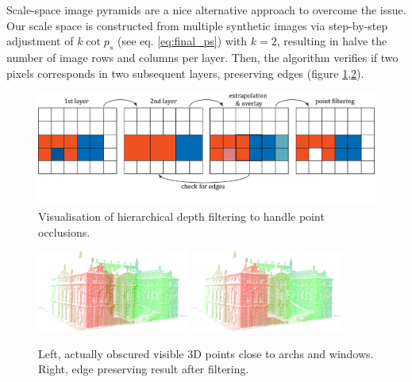 \documentclass[review]{elsarticle}
\begin{document}
Scale-space image pyramids are a nice alternative approach to overcome the issue. Our scale space is constructed from multiple synthetic images via step-by-step adjustment of $k \cot p_s$ (see eq. \ref{eq:final_ps}) with $k=2$, resulting in halve the number of image rows and columns per layer. Then, the algorithm verifies if two pixels corresponds in two subsequent layers, preserving edges (figure \ref{fig:4_3_point_filtering},\ref{fig:4_3_dist_images}). 

\begin{figure}[h]
\centering
\includegraphics[width=12cm]{graphics/4_3_point_filtering}
\caption{Visualisation of hierarchical depth filtering to handle point occlusions.}
\label{fig:4_3_point_filtering}
\end{figure}
\begin{figure}[h]
\centering
\includegraphics[width=5cm]{graphics/4_3_dist_image_orig}%
\includegraphics[width=5cm]{graphics/4_3_dist_image_filt}%
\caption{Left, actually obscured visible 3D points close to archs and windows. Right, edge preserving result after filtering.}
\label{fig:4_3_dist_images}
\end{figure}
\end{document}
